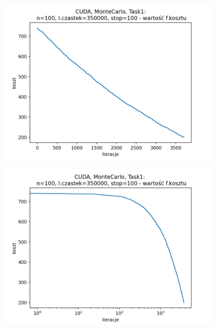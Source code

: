 \documentclass[11pt, a4paper, oneside]{article}
\begin{document}
\begin{figure}[H]
\centering
\begin{minipage}[b]{\dimexpr.5\textwidth-1em}
  \centering
  \includegraphics[width=1\linewidth]{grafiki/CUDA/CUDA_MonteCarlo_Task1_koszt_linear.png}
  \label{fig:koszt:PMC1CUDA}
\end{minipage} \hfill
\begin{minipage}[b]{\dimexpr.5\textwidth-1em}
  \centering
  \includegraphics[width=1\linewidth]{grafiki/CUDA/CUDA_MonteCarlo_Task1_koszt_log.png}
  \label{fig:koszt:MC1CUDAlog}
\end{minipage}
\end{figure}
\end{document}
